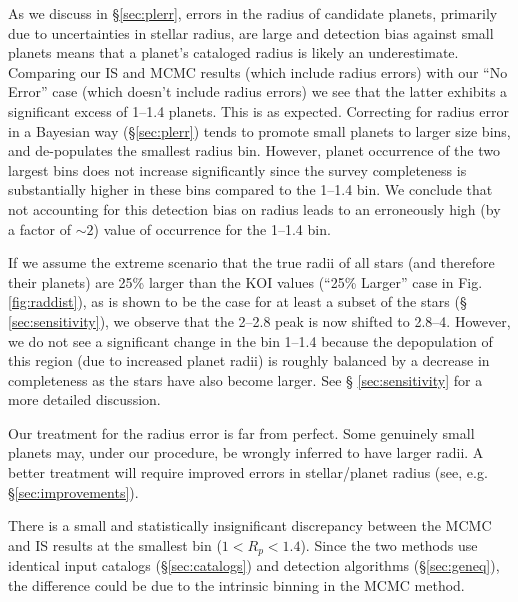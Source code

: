 As we discuss in \S \ref{sec:plerr}, errors in the radius of candidate
\kep{} planets, primarily due to uncertainties in stellar radius, are
large and detection bias against small planets means that a planet's
cataloged radius is likely an underestimate. Comparing our IS and MCMC 
results (which include radius errors) with our ``No Error'' case (which 
doesn't include radius errors) we see that the latter exhibits a significant excess of
1--1.4\rearth{} planets. This is as expected. Correcting for radius error in a
Bayesian way (\S \ref{sec:plerr}) tends to promote small planets to
larger size bins, and de-populates the smallest radius bin. However, planet occurrence of
the two largest bins does not increase significantly since the survey 
completeness is substantially higher in these bins compared to the 
1--1.4\rearth{} bin. We conclude that not accounting for this detection bias 
on radius leads to an erroneously high (by a factor of $\sim 2$)
value of occurrence for the 1--1.4\rearth{} bin.

If we assume the extreme scenario that the true radii of all
stars (and therefore their planets) are 25\% larger than the KOI
values (``25\% Larger'' case in Fig. \ref{fig:raddist}), as is shown
to be the case for at least a subset of the \kep{} stars (\S
\ref{sec:sensitivity}), we observe that the 2--2.8\rearth{} peak is now shifted to
2.8--4\rearth{}. However, we do not see a significant change in
the bin 1--1.4\rearth{} because the depopulation of this region 
(due to increased planet radii) is roughly balanced by a decrease
in completeness as the stars have also become larger. See \S
\ref{sec:sensitivity} for a more detailed discussion.

Our treatment for the radius error is far from
perfect. Some genuinely small planets may, under our procedure, be
wrongly inferred to have larger radii. A better treatment will require
improved errors in stellar/planet radius (see, e.g. \S \ref{sec:improvements}).

There is a small and statistically insignificant discrepancy
between the MCMC and IS results at the smallest bin ($1<R_p<1.4$\rearth{}).  
Since the two methods use
identical input catalogs (\S \ref{sec:catalogs}) and detection
algorithms (\S \ref{sec:geneq}), the difference could be due to the
intrinsic binning in the MCMC method. 

